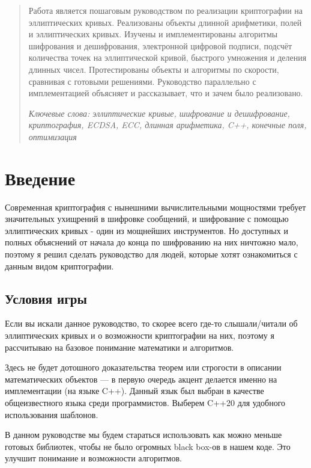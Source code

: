 
\begin{abstract}
  Работа является пошаговым руководством по реализации криптографии на эллиптических кривых. Реализованы объекты длинной арифметики, полей и эллиптических кривых. Изучены и имплементированы алгоритмы шифрования и дешифрования, электронной цифровой подписи, подсчёт количества точек на эллиптической кривой, быстрого умножения и деления длинных чисел. Протестированы объекты и алгоритмы по скорости, сравнивая с готовыми решениями. Руководство параллельно с имплементацией объясняет и рассказывает, что и зачем было реализовано.

  \textit{Ключевые слова: эллиптические кривые, шифрование и дешифрование, криптография, ECDSA, ECC, длинная арифметика, C++, конечные поля, оптимизация}
\end{abstract}

\section{Введение}
Современная криптография с нынешними вычислительными мощностями требует значительных ухищрений в шифровке сообщений, и шифрование с помощью эллиптических кривых - один из мощнейших инструментов. Но доступных и полных объяснений от начала до конца по шифрованию на них ничтожно мало, поэтому я решил сделать руководство для людей, которые хотят ознакомиться с данным видом криптографии.

\subsection{Условия игры}
 Если вы искали данное руководство, то скорее всего где-то слышали/читали об эллиптических кривых и о возможности криптографии на них, поэтому я рассчитываю на базовое понимание математики и алгоритмов.

Здесь не будет дотошного доказательства теорем или строгости в описании математических объектов --- в первую очередь акцент делается именно на имплементации (на языке C++). Данный язык был выбран в качестве общеизвестного языка среди программистов. Выберем C++20 для удобного использования шаблонов.

В данном руководстве мы будем стараться использовать как можно меньше готовых библиотек, чтобы не было огромных black box-ов в нашем коде. Это улучшит понимание и возможности алгоритмов.

